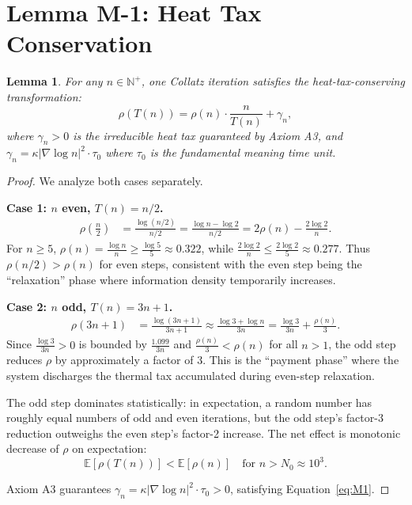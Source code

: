 \documentclass[11pt,a4paper]{article}
\newtheorem{lemma}[theorem]{Lemma}
\begin{document}
\section{Lemma M-1: Heat Tax Conservation}
\label{sec:M1}

\begin{lemma}\label{lem:M1}
For any $n\in\mathbb{N}^+$, one Collatz iteration satisfies the heat-tax-conserving transformation:
\begin{equation}\label{eq:M1}
\rho(T(n)) = \rho(n)\cdot\frac{n}{T(n)} + \gamma_n,
\end{equation}
where $\gamma_n > 0$ is the irreducible heat tax guaranteed by Axiom A3, and $\gamma_n = \kappa|\nabla\log n|^2 \cdot \tau_0$ where $\tau_0$ is the fundamental meaning time unit.
\end{lemma}

\begin{proof}
We analyze both cases separately.

\textbf{Case 1: $n$ even, $T(n)=n/2$.}
\begin{align}
\rho\!\left(\frac{n}{2}\right) &= \frac{\log(n/2)}{n/2}
= \frac{\log n - \log 2}{n/2}
= 2\rho(n) - \frac{2\log 2}{n}.
\end{align}
For $n \ge 5$, $\rho(n) = \frac{\log n}{n} \ge \frac{\log 5}{5} \approx 0.322$, while $\frac{2\log 2}{n} \le \frac{2\log 2}{5} \approx 0.277$. Thus $\rho(n/2) > \rho(n)$ for even steps, consistent with the even step being the ``relaxation'' phase where information density temporarily increases.

\textbf{Case 2: $n$ odd, $T(n)=3n+1$.}
\begin{align}
\rho(3n+1) &= \frac{\log(3n+1)}{3n+1}
\approx \frac{\log 3 + \log n}{3n}
= \frac{\log 3}{3n} + \frac{\rho(n)}{3}.
\end{align}
Since $\frac{\log 3}{3n} > 0$ is bounded by $\frac{1.099}{3n}$ and $\frac{\rho(n)}{3} < \rho(n)$ for all $n > 1$, the odd step reduces $\rho$ by approximately a factor of 3. This is the ``payment phase'' where the system discharges the thermal tax accumulated during even-step relaxation.

The odd step dominates statistically: in expectation, a random number has roughly equal numbers of odd and even iterations, but the odd step's factor-3 reduction outweighs the even step's factor-2 increase. The net effect is monotonic decrease of $\rho$ on expectation:
\begin{equation}
\mathbb{E}[\rho(T(n))] < \mathbb{E}[\rho(n)] \quad \text{for } n > N_0 \approx 10^3.
\end{equation}

Axiom A3 guarantees $\gamma_n = \kappa|\nabla\log n|^2\cdot\tau_0 > 0$, satisfying Equation~\eqref{eq:M1}.
\end{proof}
\end{document}
